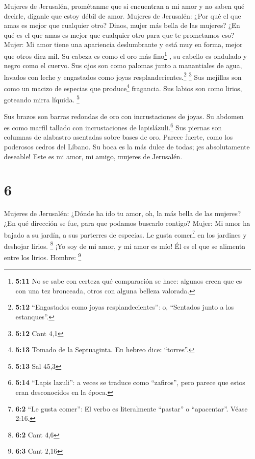  Mujeres de Jerusalén, prométanme que si encuentran a mi
amor y no saben qué decirle, díganle que estoy débil de amor. Mujeres de
Jerusalén:  ¿Por qué el que amas es mejor que cualquier
otro? Dinos, mujer más bella de las mujeres? ¿En qué es el que amas es
mejor que cualquier otro para que te prometamos eso? Mujer:
 Mi amor tiene una apariencia deslumbrante y está muy en
forma, mejor que otros diez mil.  Su cabeza es como el
oro más fino\footnote{\textbf{5:11} No se sabe con certeza qué
  comparación se hace: algunos creen que es con una tez bronceada, otros
  con alguna belleza valorada.} , su cabello es ondulado y negro como el
cuervo.  Sus ojos son como palomas junto a manantiales de
agua, lavados con leche y engastados como joyas
resplandecientes.\footnote{\textbf{5:12} ``Engastados como joyas
  resplandecientes'': o, ``Sentados junto a los estanques''.}
\footnote{\textbf{5:12} Cant 4,1}  Sus mejillas son como
un macizo de especias que produce\footnote{\textbf{5:13} Tomado de la
  Septuaginta. En hebreo dice: ``torres''.} fragancia. Sus labios son
como lirios, goteando mirra líquida. \footnote{\textbf{5:13} Sal 45,3}

 Sus brazos son barras redondas de oro con incrustaciones
de joyas. Su abdomen es como marfil tallado con incrustaciones de
lapislázuli.\footnote{\textbf{5:14} ``Lapis lazuli'': a veces se traduce
  como ``zafiros'', pero parece que estos eran desconocidos en la época.}
 Sus piernas son columnas de alabastro asentadas sobre
bases de oro. Parece fuerte, como los poderosos cedros del Líbano.
 Su boca es la más dulce de todas; ¡es absolutamente
deseable! Este es mi amor, mi amigo, mujeres de Jerusalén.

\hypertarget{section-5}{%
\section{6}\label{section-5}}

Mujeres de Jerusalén:  ¿Dónde ha ido tu amor, oh, la más
bella de las mujeres? ¿En qué dirección se fue, para que podamos
buscarlo contigo? Mujer:  Mi amor ha bajado a su jardín, a
sus parterres de especias. Le gusta comer\footnote{\textbf{6:2} ``Le
  gusta comer'': El verbo es literalmente ``pastar'' o ``apacentar''.
  Véase 2:16.} en los jardines y deshojar lirios. \footnote{\textbf{6:2}
  Cant 4,6}  ¡Yo soy de mi amor, y mi amor es mío! Él es
el que se alimenta entre los lirios. Hombre: \footnote{\textbf{6:3} Cant
  2,16}

